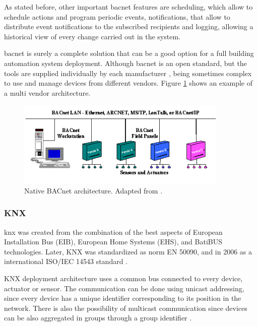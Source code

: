 As stated before, other important \ac{bacnet} features are scheduling, which allow to schedule actions and program periodic events, notifications, that allow to distribute event notifications to the subscribed recipients \cite{Domingues2016} and logging, allowing a historical view of every change carried out in the system.

\ac{bacnet} is surely a complete solution that can be a good option for a full building automation system deployment. Although \ac{bacnet} is an open standard, but the tools are supplied individually by each manufacturer \cite{openprotocol}, being sometimes complex to use and manage devices from different vendors. Figure \ref{fig:bacnet} shows an example of a multi vendor architecture.


\begin{figure}[H]
	\centering
	\includegraphics[width=0.9\textwidth]{figures/bacnet.png}
	\caption{Native BACnet architecture. Adapted from \cite{bacnetimage}. }
	\label{fig:bacnet}
\end{figure}


\subsubsection{KNX}

\ac{knx} was created from the combination of the best aspects of European Installation Bus (EIB), European Home Systems (EHS), and BatiBUS technologies. Later, KNX was standardized as norm EN 50090, and in 2006 as a international ISO/IEC 14543 standard \cite{Domingues2016}.

KNX deployment architecture uses a common bus connected to every device, actuator or sensor. The communication can be done using unicast addressing, since every device has a unique identifier corresponding to its position in the network. There is also the possibility of multicast communication since devices can be also aggregated in groups through a group identifier \cite{Kastner2005}.  

